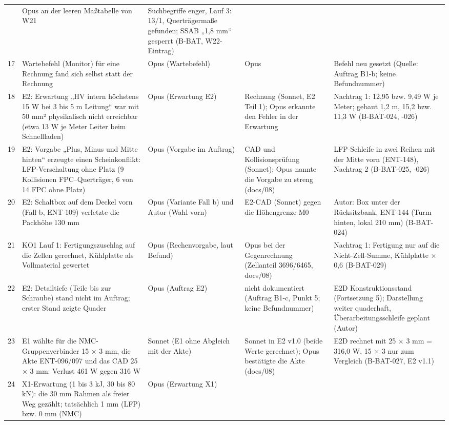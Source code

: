 \documentclass[10pt,a4paper]{article}
\begin{document}
\begin{longtable}{@{}p{0.4cm}p{3.6cm}p{2.5cm}p{4.4cm}p{3.0cm}@{}}
 & Opus an der leeren Maßtabelle von W21 & Suchbegriffe enger, Lauf 3: 13/1, Querträgermaße gefunden; SSAB „1,8 mm“ gesperrt (B-BAT, W22-Eintrag)\\
17 & Wartebefehl (Monitor) für eine Rechnung fand sich selbst statt der Rechnung & Opus (Wartebefehl)
 & Opus & Befehl neu gesetzt (Quelle: Auftrag B1-b; keine Befundnummer)\\\midrule
18 & E2: Erwartung „HV intern höchstens 15 W bei 3 bis 5 m Leitung“ war mit 50 mm² physikalisch nicht erreichbar (etwa 13 W je Meter Leiter beim Schnellladen) & Opus (Erwartung E2)
 & Rechnung (Sonnet, E2 Teil 1); Opus erkannte den Fehler in der Erwartung & Nachtrag 1: 12,95 bzw. 9,49 W je Meter; gebaut 1,2 m, 15,2 bzw. 11,3 W (B-BAT-024, -026)\\
19 & E2: Vorgabe „Plus, Minus und Mitte hinten“ erzeugte einen Scheinkonflikt: LFP-Verschaltung ohne Platz (9 Kollisionen FPC--Querträger, 6 von 14 FPC ohne Platz) & Opus (Vorgabe im Auftrag)
 & CAD und Kollisionsprüfung (Sonnet); Opus nannte die Vorgabe zu streng (docs/08) & LFP-Schleife in zwei Reihen mit der Mitte vorn (ENT-148), Nachtrag 2 (B-BAT-025, -026)\\
20 & E2: Schaltbox auf dem Deckel vorn (Fall b, ENT-109) verletzte die Packhöhe 130 mm & Opus (Variante Fall b) und Autor (Wahl vorn)
 & E2-CAD (Sonnet) gegen die Höhengrenze M0 & Autor: Box unter der Rücksitzbank, ENT-144 (Turm hinten, lokal 210 mm) (B-BAT-024)\\
21 & KO1 Lauf 1: Fertigungszuschlag auf die Zellen gerechnet, Kühlplatte als Vollmaterial gewertet & Opus (Rechenvorgabe, laut Befund)
 & Opus bei der Gegenrechnung (Zellanteil 3696/6465, docs/08) & Nachtrag 1: Fertigung nur auf die Nicht-Zell-Summe, Kühlplatte $\times$ 0,6 (B-BAT-029)\\
22 & E2: Detailtiefe (Teile bis zur Schraube) stand nicht im Auftrag; erster Stand zeigte Quader & Opus (Auftrag E2)
 & nicht dokumentiert (Auftrag B1-c, Punkt 5; keine Befundnummer) & E2D Konstruktionsstand (Fortsetzung 5); Darstellung weiter quaderhaft, Überarbeitungsschleife geplant (Autor)\\
23 & E1 wählte für die NMC-Gruppenverbinder 15 × 3 mm, die Akte ENT-096/097 und das CAD 25 × 3 mm: Verlust 461 W gegen 316 W & Sonnet (E1 ohne Abgleich mit der Akte)
 & Sonnet in E2 v1.0 (beide Werte gerechnet); Opus bestätigte die Akte (docs/08) & E2D rechnet mit 25 × 3 mm = 316,0 W, 15 × 3 nur zum Vergleich (B-BAT-027, E2 v1.1)\\\midrule
24 & X1-Erwartung (1 bis 3 kJ, 30 bis 80 kN): die 30 mm Rahmen als freier Weg gezählt; tatsächlich 1 mm (LFP) bzw. 0 mm (NMC) & Opus (Erwartung X1)

\end{longtable}
\end{document}
